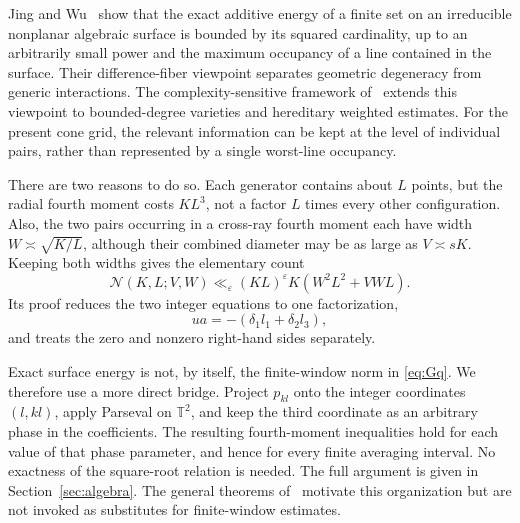 \documentclass[11pt,reqno]{amsart}
\numberwithin{equation}{section}
\theoremstyle{definition}
\theoremstyle{remark}
\newcommand{\T}{\mathbb T}
\newcommand{\eps}{\varepsilon}
\begin{document}
Jing and Wu~\cite[Theorem~1.1]{JW} show that the exact additive energy of a finite set on an
irreducible nonplanar algebraic surface is bounded by its squared cardinality, up to an
arbitrarily small power and the maximum occupancy of a line contained in the surface.
Their difference-fiber viewpoint separates geometric degeneracy from generic interactions.
The complexity-sensitive framework of~\cite[Theorem~1.1 and Proposition~5.1]{HuEnergy}
extends this viewpoint to bounded-degree varieties and hereditary weighted estimates.
For the present cone grid, the relevant information can be kept at the level of individual
pairs, rather than represented by a single worst-line occupancy.

There are two reasons to do so. Each generator contains about $L$ points, but the radial
fourth moment costs $KL^3$, not a factor $L$ times every other configuration.
Also, the two pairs occurring in a cross-ray fourth moment each have width
$W\asymp\sqrt{K/L}$, although their combined diameter may be as large as $V\asymp sK$.
Keeping both widths gives the elementary count
\begin{equation}\label{eq:paircountintro}
 \mathcal N(K,L;V,W)\ll_\eps (KL)^\eps K(W^2L^2+VWL).
\end{equation}
Its proof reduces the two integer equations to one factorization,
\[
 u a=-(\delta_1l_1+\delta_2l_3),
\]
and treats the zero and nonzero right-hand sides separately.

Exact surface energy is not, by itself, the finite-window norm in \eqref{eq:Gq}.
We therefore use a more direct bridge. Project $p_{kl}$ onto the integer coordinates
$(l,kl)$, apply Parseval on $\T^2$, and keep the third coordinate as an arbitrary phase in
the coefficients. The resulting fourth-moment inequalities hold for each value of that
phase parameter, and hence for every finite averaging interval. No exactness of the
square-root relation is needed. The full argument is given in Section~\ref{sec:algebra}.
The general theorems of~\cite{JW,HuEnergy} motivate this organization but are not invoked
as substitutes for finite-window estimates.
\end{document}
